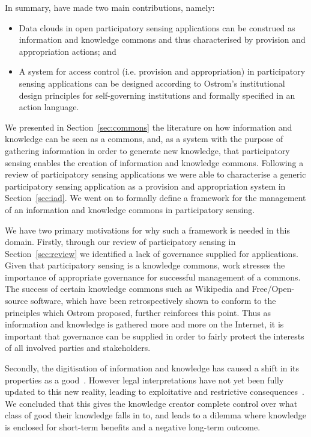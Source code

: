 In summary, have made two main contributions, namely:
\begin{itemize}
\item Data clouds in open participatory sensing applications can be construed as information and knowledge commons and thus characterised by provision and appropriation actions; and
\item A system for access control (i.e. provision and appropriation) in participatory sensing applications can be designed according to Ostrom's institutional design principles for self-governing institutions and formally specified in an action language.
\end{itemize}
We presented in Section~\ref{sec:commons} the literature on how information and knowledge can be seen as a commons, and, as a system with the purpose of gathering information in order to generate new knowledge, that participatory sensing enables the creation of information and knowledge commons. Following a review of participatory sensing applications we were able to characterise a generic participatory sensing application as a provision and appropriation system in Section~\ref{sec:iad}. We went on to formally define a framework for the management of an information and knowledge commons in participatory sensing.

We have two primary motivations for why such a framework is needed in this domain. 
Firstly, through our review of participatory sensing in Section~\ref{sec:review} we identified a lack of governance supplied for applications. Given that participatory sensing is a knowledge commons,  work stresses the importance of appropriate governance for successful management of a commons. The success of certain knowledge commons such as Wikipedia and Free/Open-source software, which have been retrospectively shown to conform to the principles which Ostrom proposed, further reinforces this point. Thus as information and knowledge is gathered more and more on the Internet, it is important that governance can be supplied in order to fairly protect the interests of all involved parties and stakeholders.

Secondly, the digitisation of information and knowledge has caused a shift in its properties as a good~\citep{Ostrom2003}. However legal interpretations have not yet been fully updated to this new reality, leading to exploitative and restrictive consequences~\citep{Lessig2004}. We concluded that this gives the knowledge creator complete control over what class of good their knowledge falls in to, and leads to a dilemma where knowledge is enclosed for short-term benefits and a negative long-term outcome.

